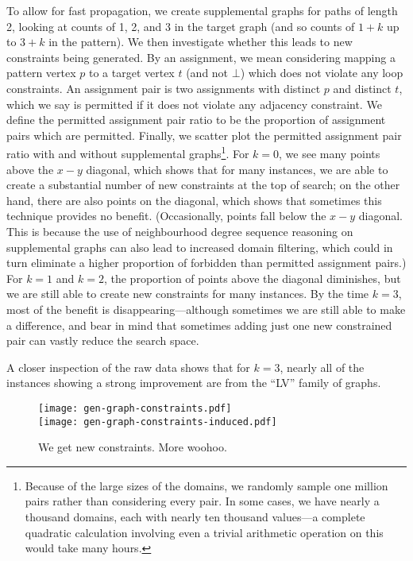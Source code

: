 \documentclass[letterpaper]{article}
\theoremstyle{definition}
\begin{document}
To allow for fast propagation, we create supplemental graphs for paths of length 2, looking at
counts of 1, 2, and 3 in the target graph (and so counts of $1 + k$ up to $3 + k$ in the pattern).
We then investigate whether this leads to new constraints being generated. By an assignment, we mean
considering mapping a pattern vertex $p$ to a target vertex $t$ (and not $\bot$) which does not
violate any loop constraints. An assignment pair is two assignments with distinct $p$ and distinct
$t$, which we say is permitted if it does not violate any adjacency constraint. We define the
permitted assignment pair ratio to be the proportion of assignment pairs which are permitted.
Finally, we scatter plot the permitted assignment pair ratio with and without supplemental
graphs\footnote{Because of the large sizes of the domains, we randomly sample one million pairs
rather than considering every pair. In some cases, we have nearly a thousand domains, each with nearly
ten thousand values---a complete quadratic calculation involving even a trivial arithmetic operation
on this would take many hours.}. For $k = 0$, we see many points above the $x-y$ diagonal, which
shows that for many instances, we are able to create a substantial number of new constraints at the
top of search; on the other hand, there are also points on the diagonal, which shows that sometimes
this technique provides no benefit. (Occasionally, points fall below the $x-y$ diagonal. This is
because the use of neighbourhood degree sequence reasoning on supplemental graphs can also lead to
increased domain filtering, which could in turn eliminate a higher proportion of forbidden than
permitted assignment pairs.) For $k = 1$ and $k = 2$, the proportion of points above the diagonal
diminishes, but we are still able to create new constraints for many instances. By the time $k = 3$,
most of the benefit is disappearing---although sometimes we are still able to make a difference, and
bear in mind that sometimes adding just one new constrained pair can vastly reduce the search space.

A closer inspection of the raw data shows that for $k = 3$, nearly all of the instances showing a
strong improvement are from the ``LV'' family of graphs.

\begin{figure*}
    \texttt{[image: gen-graph-constraints.pdf]}\\[0.1cm]
    \texttt{[image: gen-graph-constraints-induced.pdf]}
    \caption{We get new constraints. More woohoo.}\label{figure:constraints}
\end{figure*}
\end{document}
